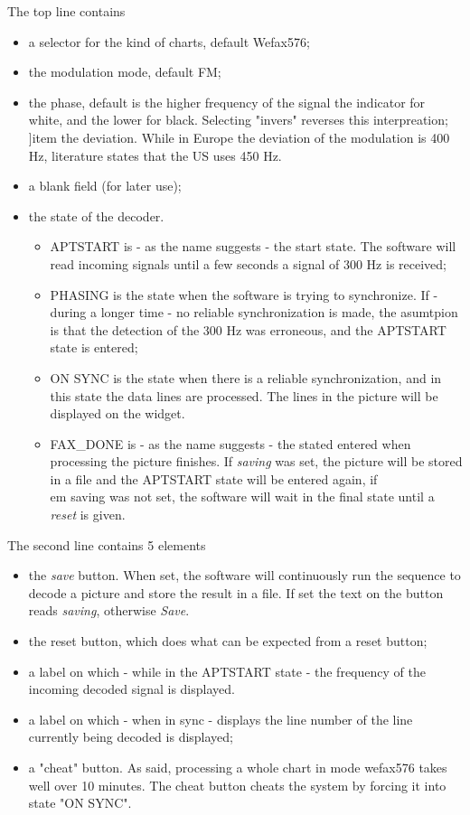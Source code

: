 \documentclass[11pt]{article}
\begin{document}
The top line contains
\begin{itemize}
\item a selector for the kind of charts, default Wefax576;
\item the modulation mode, default FM;
\item the phase, default is the higher frequency of the signal the indicator
for white, and the lower for black. Selecting "invers" reverses this
interpreation;
]item the deviation. While in Europe the deviation of the modulation is
400 Hz, literature states that the US uses 450 Hz.
\item a blank field (for later use);
\item the state of the decoder. 
\begin{itemize}
\item APTSTART is - as the name suggests - the start state. The software
will read incoming signals until a few seconds a signal of 300 Hz
is received;
\item PHASING is the state when the software is trying to synchronize.
If - during a longer time - no reliable synchronization is made, the
asumtpion is that the detection of the 300 Hz was erroneous, and the APTSTART
state is entered;
\item ON SYNC is the state when there is a reliable synchronization, and
in this state the data lines are processed.
The lines in the picture will be displayed on the widget.
\item FAX\_DONE is - as the name suggests - the stated entered when
processing the picture finishes. If {\em saving} was set, the picture
will be stored in a file and the APTSTART state will be entered again,
if {\\em saving} was not set, the software will wait in the final state
until a {\em reset} is given.
\end{itemize}
\end{itemize}
The second line contains 5 elements
\begin{itemize}
\item the {\em save} button. When set, the software will continuously
run the sequence to decode a picture and store the result in a file.
If set the text on the button reads {\em saving}, otherwise {\em Save}.
\item the reset button, which does what can be expected from a reset button;
\item a label on which - while in the APTSTART state - the frequency
of the incoming decoded signal is displayed.
\item a label on which - when in sync - displays the line number
of the line currently being decoded is displayed;
\item a "cheat" button. As said, processing a whole chart in mode wefax576
takes well over 10 minutes. The cheat button cheats the system by forcing
it into state "ON SYNC".
\end{itemize}
\end{document}
